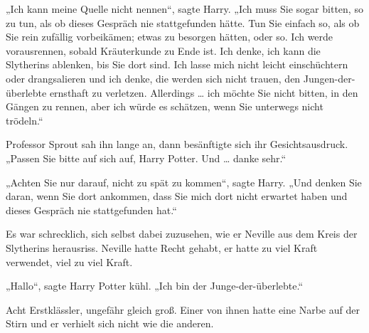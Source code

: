 „Ich kann meine Quelle nicht nennen“, sagte Harry.
„Ich muss Sie sogar bitten, so zu tun, als ob dieses Gespräch nie stattgefunden hätte. Tun Sie einfach so, als ob Sie rein zufällig vorbeikämen; etwas zu besorgen hätten, oder so. Ich werde vorausrennen, sobald Kräuterkunde zu Ende ist. Ich denke, ich kann die Slytherins ablenken, bis Sie dort sind. Ich lasse mich nicht leicht einschüchtern oder drangsalieren und ich denke, die werden sich nicht trauen, den Jungen-der-überlebte ernsthaft zu verletzen. Allerdings … ich möchte Sie nicht bitten, in den Gängen zu rennen, aber ich würde es schätzen, wenn Sie unterwegs nicht trödeln.“

Professor Sprout sah ihn lange an, dann besänftigte sich ihr Gesichtsausdruck.
„Passen Sie bitte auf sich auf, Harry Potter. Und … danke sehr.“

„Achten Sie nur darauf, nicht zu spät zu kommen“, sagte Harry.
„Und denken Sie daran, wenn Sie dort ankommen, dass Sie mich dort nicht erwartet haben und dieses Gespräch nie stattgefunden hat.“

\later

Es war schrecklich, sich selbst dabei zuzusehen, wie er Neville aus dem Kreis der Slytherins herausriss. Neville hatte Recht gehabt, er hatte zu viel Kraft verwendet, viel zu viel Kraft.

„Hallo“, sagte Harry Potter kühl.
„Ich bin der Junge-der-überlebte.“

Acht Erstklässler, ungefähr gleich groß. Einer von ihnen hatte eine Narbe auf der Stirn und er verhielt sich nicht wie die anderen.

